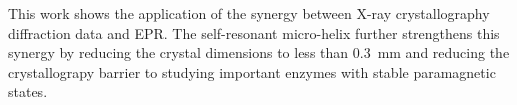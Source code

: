 This work shows the application of the synergy between X-ray crystallography diffraction data and EPR. The self-resonant micro-helix further strengthens this synergy by reducing the crystal dimensions to less than 0.3~mm and reducing the crystallograpy barrier to studying important enzymes with stable paramagnetic states.


{\renewcommand{\bibsection}{\clearpage\section*{\bibname}\markboth{\bibname}{\bibname}}
\renewcommand{\bibname}{CHAPTER 6. REFERENCES}


}
